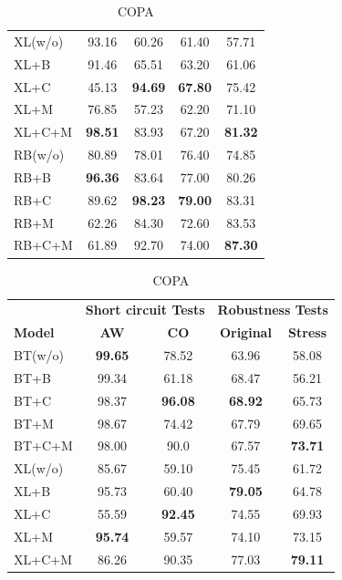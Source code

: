 \begin{table}[th!]
\begin{subtable}[t]{0.48\textwidth}
\begin{tabular}{l|cc|cc}
\rowcolor{Gray}
XL(w/o)&93.16&60.26&61.40&57.71\\
XL+B&91.46&65.51&63.20&61.06\\
XL+C&45.13&\textbf{94.69}&\textbf{67.80}&75.42\\
XL+M&76.85&57.23&62.20&71.10\\
XL+C+M&\textbf{98.51}&83.93&67.20&\textbf{81.32}\\

\midrule

\rowcolor{Gray}
RB(w/o)&80.89&78.01&76.40&74.85\\
RB+B&\textbf{96.36}&83.64&77.00&80.26\\
RB+C&89.62&\textbf{98.23}&\textbf{79.00}&83.31\\
RB+M&62.26&84.30&72.60&83.53\\
RB+C+M&61.89&92.70&74.00&\textbf{87.30}\\
\bottomrule
\end{tabular}
\caption{COPA}
\end{subtable} 
\hfill
\begin{subtable}[t]{0.48\textwidth}
\centering
\begin{tabular}{l|cc|cc}\toprule
	& \multicolumn{2}{c|}{\bf Short circuit Tests} & \multicolumn{2}{c}{\bf Robustness Tests} \\ \cline{2-5}
\textbf{Model} &\textbf{AW} &\textbf{CO} & \textbf{Original} &\textbf{Stress}\\ \hline
\rowcolor{Gray}
BT(w/o)&\textbf{99.65}&78.52&63.96&58.08\\
BT+B&99.34&61.18&68.47&56.21\\
BT+C&98.37&\textbf{96.08}&\textbf{68.92}&65.73\\
BT+M&98.67&74.42&67.79&69.65\\
BT+C+M&98.00&90.0&67.57&\textbf{73.71}\\
\midrule
                   
\rowcolor{Gray}
XL(w/o)&85.67&59.10&75.45&61.72\\
XL+B&95.73&60.40&\textbf{79.05}&64.78\\
XL+C&55.59&\textbf{92.45}&74.55&69.93\\
XL+M&\textbf{95.74}&59.57&74.10&73.15\\
XL+C+M&86.26&90.35&77.03&\textbf{79.11}\\
\midrule


\end{tabular}
\end{subtable}
\end{table}
